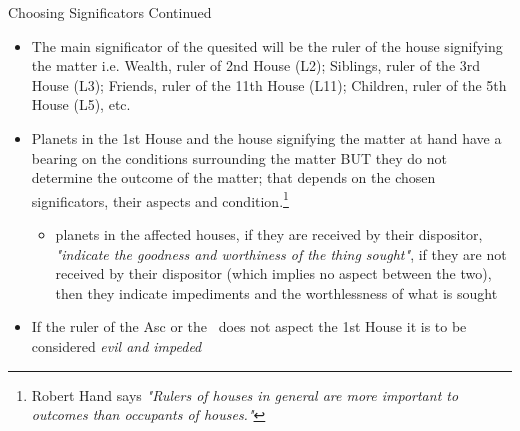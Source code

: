 \begin{frame}[t]{Choosing Significators Continued}
\begin{itemize}
\item The main significator of the quesited will be the ruler of the house signifying the matter i.e.  Wealth, ruler of 2nd House (L2); Siblings, ruler of the 3rd House (L3); Friends, ruler of the 11th House (L11); Children, ruler of the 5th House (L5), etc.
\item Planets in the 1st House and the house signifying the matter at hand have a bearing on the conditions surrounding the matter BUT they do not determine the outcome of the matter; that depends on the chosen significators, their aspects and condition.\footnote{Robert Hand says \textsl{"Rulers of houses in general are more important to outcomes than occupants of houses."}}
	\begin{itemize}
		\item planets in the affected houses, if they are received by their dispositor, \textsl{"indicate the goodness and worthiness of the thing sought"}, if they are not received by their dispositor (which implies no aspect between the two), then they indicate impediments and the worthlessness of what is sought
	\end{itemize}
\item If the ruler of the Asc or the \Moon\ does not aspect the 1st House it is to be considered \textsl{evil and impeded}
\end{itemize}

\end{frame}